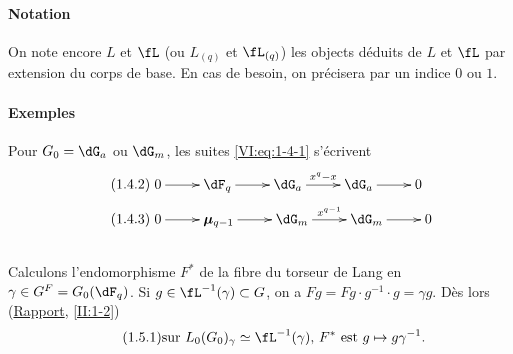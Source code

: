 \paragraph{Notation}
On note encore $L$ et $\fL$ (ou $L_{(q)}$ et $\fL_{(q)}$) les objects déduits 
de $L$ et $\fL$ par extension du corps de base. En cas de besoin, on 
précisera par un indice $0$ ou $1$.


\paragraph{Exemples}
Pour $G_0=\dG_a$ ou $\dG_m$, les suites \eqref{VI:eq:1-4-1} s'écrivent 
\begin{align*}\tag{1.4.2}\label{VI:eq:1-4-2}
&\xymatrix{
  0 \ar[r] 
    & \dF_q \ar[r] 
    & \dG_a \ar[r]^-{x^q-x} 
    & \dG_a \ar[r] 
    & 0 
} \\
\tag{1.4.3}\label{VI:eq:1-4-3}
&\xymatrix{
  0 \ar[r] 
    & \dmu_{q-1} \ar[r] 
    & \dG_m \ar[r]^-{x^{q-1}} 
    & \dG_m \ar[r] 
    & 0
}
\end{align*}





\subsection{}\label{VI:1-5}

Calculons l'endomorphisme $F^\ast$ de la fibre du torseur de Lang en 
$\gamma\in G^F=G_0(\dF_q)$. Si $g\in \fL^{-1}(\gamma)\subset G$, on a 
$F g = F g\cdot g^{-1}\cdot g = \gamma g$. Dès lors (\hyperref[II]{Rapport}, 
\ref{II:1-2}) 
\begin{equation*}\tag{1.5.1}\label{VI:eq:1-5-1}
  \text{sur $L_0(G_0)_\gamma\simeq \fL^{-1}(\gamma)$, $F^\ast$ est $g\mapsto g\gamma^{-1}$.}
\end{equation*}





\subsection{}\label{VI:1-6}

